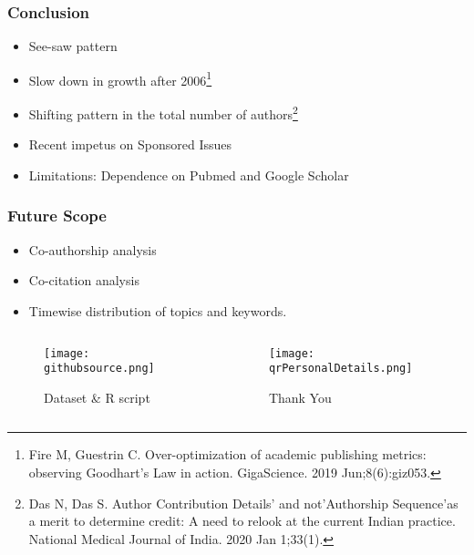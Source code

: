 \documentclass[14pt, aspectratio=169]{beamer}
\begin{document}
\begin{frame}
  \frametitle{Conclusion}
  \begin{itemize}
    \item See-saw pattern 
    \item Slow down in growth after 2006\footnote{Fire M, Guestrin C. Over-optimization of academic publishing metrics: observing Goodhart’s Law in action. GigaScience. 2019 Jun;8(6):giz053.}
    \item Shifting pattern in the total number of authors\footnote{Das N, Das S. Author Contribution Details' and not'Authorship Sequence'as a merit to determine credit: A need to relook at the current Indian practice. National Medical Journal of India. 2020 Jan 1;33(1).}
    \item Recent impetus on Sponsored Issues
    \item Limitations: Dependence on Pubmed and Google Scholar
  \end{itemize}
\end{frame}

\begin{frame}
  \frametitle{Future Scope}
  \begin{itemize}
    \item Co-authorship analysis
    \item Co-citation analysis
    \item Timewise distribution of topics and keywords. 
  \end{itemize}
  \begin{columns}[c]
    \begin{column}{0.5\textwidth}
      \begin{figure}
      \texttt{[image: githubsource.png]}
      \caption{Dataset \& R script}
      \end{figure}
    \end{column}
    \begin{column}{0.5\textwidth}
      \begin{figure}
      \texttt{[image: qrPersonalDetails.png]}
      \caption{Thank You}
      \end{figure}
    \end{column}
  \end{columns}
\end{frame}
\end{document}
